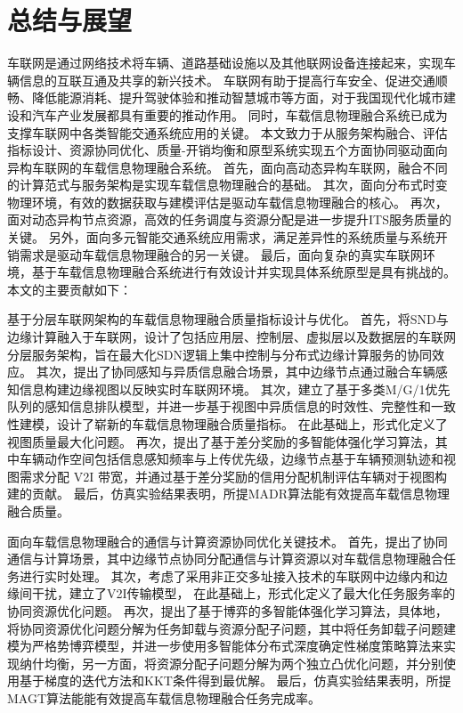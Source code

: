 \chapter{总结与展望}\label{section 6}

车联网是通过网络技术将车辆、道路基础设施以及其他联网设备连接起来，实现车辆信息的互联互通及共享的新兴技术。
车联网有助于提高行车安全、促进交通顺畅、降低能源消耗、提升驾驶体验和推动智慧城市等方面，对于我国现代化城市建设和汽车产业发展都具有重要的推动作用。
同时，车载信息物理融合系统已成为支撑车联网中各类智能交通系统应用的关键。
本文致力于从服务架构融合、评估指标设计、资源协同优化、质量-开销均衡和原型系统实现五个方面协同驱动面向异构车联网的车载信息物理融合系统。
首先，面向高动态异构车联网，融合不同的计算范式与服务架构是实现车载信息物理融合的基础。
其次，面向分布式时变物理环境，有效的数据获取与建模评估是驱动车载信息物理融合的核心。
再次，面对动态异构节点资源，高效的任务调度与资源分配是进一步提升ITS服务质量的关键。
另外，面向多元智能交通系统应用需求，满足差异性的系统质量与系统开销需求是驱动车载信息物理融合的另一关键。
最后，面向复杂的真实车联网环境，基于车载信息物理融合系统进行有效设计并实现具体系统原型是具有挑战的。
本文的主要贡献如下：

 基于分层车联网架构的车载信息物理融合质量指标设计与优化。
首先，将SND与边缘计算融入于车联网，设计了包括应用层、控制层、虚拟层以及数据层的车联网分层服务架构，旨在最大化SDN逻辑上集中控制与分布式边缘计算服务的协同效应。
其次，提出了协同感知与异质信息融合场景，其中边缘节点通过融合车辆感知信息构建边缘视图以反映实时车联网环境。
其次，建立了基于多类M/G/1优先队列的感知信息排队模型，并进一步基于视图中异质信息的时效性、完整性和一致性建模，设计了崭新的车载信息物理融合质量指标。
在此基础上，形式化定义了视图质量最大化问题。
再次，提出了基于差分奖励的多智能体强化学习算法，其中车辆动作空间包括信息感知频率与上传优先级，边缘节点基于车辆预测轨迹和视图需求分配 V2I 带宽，并通过基于差分奖励的信用分配机制评估车辆对于视图构建的贡献。
最后，仿真实验结果表明，所提MADR算法能有效提高车载信息物理融合质量。

 面向车载信息物理融合的通信与计算资源协同优化关键技术。
首先，提出了协同通信与计算场景，其中边缘节点协同分配通信与计算资源以对车载信息物理融合任务进行实时处理。
其次，考虑了采用非正交多址接入技术的车联网中边缘内和边缘间干扰，建立了V2I传输模型，
在此基础上，形式化定义了最大化任务服务率的协同资源优化问题。
再次，提出了基于博弈的多智能体强化学习算法，具体地，将协同资源优化问题分解为任务卸载与资源分配子问题，其中将任务卸载子问题建模为严格势博弈模型，并进一步使用多智能体分布式深度确定性梯度策略算法来实现纳什均衡，另一方面，将资源分配子问题分解为两个独立凸优化问题，并分别使用基于梯度的迭代方法和KKT条件得到最优解。
最后，仿真实验结果表明，所提MAGT算法能能有效提高车载信息物理融合任务完成率。

